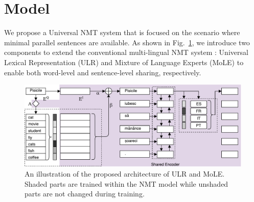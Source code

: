 
\section{Model}
We propose a Universal NMT system that is focused on the scenario where minimal parallel sentences are available. 
As shown in Fig.~\ref{cp5.fig.model}, we introduce two components to extend the conventional multi-lingual NMT system \cite{johnson2016google}: Universal Lexical Representation (ULR) and Mixture of Language Experts (MoLE) to enable both word-level and sentence-level sharing, respectively.
\begin{figure}[hptb]
	\centering
	\includegraphics[width=\linewidth]{figs/ulr/model2x}
      \caption{\label{cp5.fig.model} An illustration of the proposed architecture of ULR and MoLE. Shaded parts are trained within the NMT model while unshaded parts are not changed during  training.}
  \end{figure}

